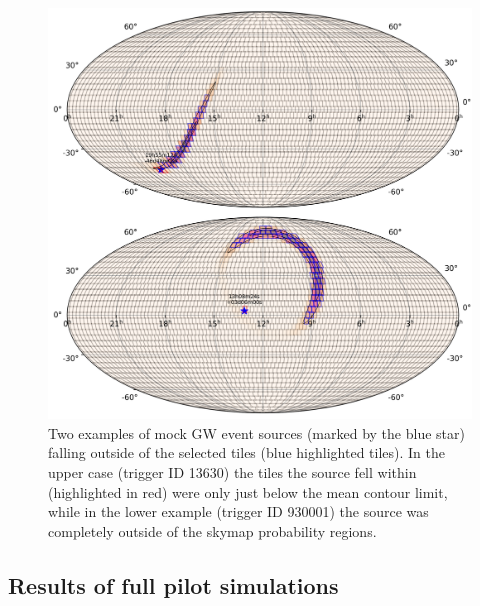 \begin{colsection}
\begin{colsection}
\begin{figure}[p]
    \begin{center}
        \includegraphics[width=\linewidth]{images/non_selected.pdf}
    \end{center}
    \caption[Examples of mock GW event sources falling outside of the selected tiles]{
        Two examples of mock GW event sources (marked by the blue star) falling outside of the selected tiles (blue highlighted tiles). In the upper case (trigger ID 13630) the tiles the source fell within (highlighted in red) were only just below the mean contour limit, while in the lower example (trigger ID 930001) the source was completely outside of the skymap probability regions.
    }\label{fig:poor_selection}
\end{figure}

\clearpage

\end{colsection}


\subsection{Results of full pilot simulations}
\label{sec:gw_sim_results}
\begin{colsection}


\end{colsection}
\end{colsection}
